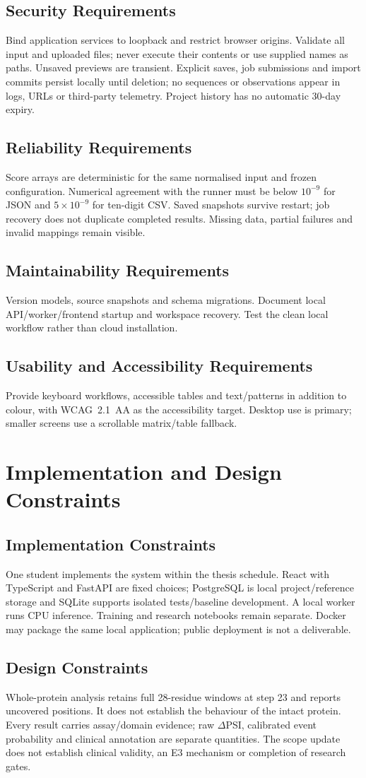 \subsection{Security Requirements}
Bind application services to loopback and restrict browser origins. Validate all input and uploaded files;
never execute their contents or use supplied names as paths. Unsaved previews are transient. Explicit
saves, job submissions and import commits persist locally until deletion; no sequences or observations
appear in logs, URLs or third-party telemetry. Project history has no automatic 30-day expiry.
\subsection{Reliability Requirements}
Score arrays are deterministic for the same normalised input and frozen configuration. Numerical
agreement with the runner must be below $10^{-9}$ for JSON and $5\times10^{-9}$ for ten-digit CSV.
Saved snapshots survive restart; job recovery does not duplicate completed results. Missing data,
partial failures and invalid mappings remain visible.
\subsection{Maintainability Requirements}
Version models, source snapshots and schema migrations. Document local API/worker/frontend startup and
workspace recovery. Test the clean local workflow rather than cloud installation.
\subsection{Usability and Accessibility Requirements}
Provide keyboard workflows, accessible tables and text/patterns in addition to colour, with WCAG~2.1~AA
as the accessibility target. Desktop use is primary; smaller screens use a scrollable matrix/table fallback.

\section{Implementation and Design Constraints}
\subsection{Implementation Constraints}
One student implements the system within the thesis schedule. React with TypeScript and FastAPI are
fixed choices; PostgreSQL is local project/reference storage and SQLite supports isolated tests/baseline
development. A local worker runs CPU inference. Training and research notebooks remain separate.
Docker may package the same local application; public deployment is not a deliverable.
\subsection{Design Constraints}
Whole-protein analysis retains full 28-residue windows at step 23 and reports uncovered positions.
It does not establish the behaviour of the intact protein. Every result carries assay/domain evidence;
raw $\Delta$PSI, calibrated event probability and clinical annotation are separate quantities. The scope
update does not establish clinical validity, an E3 mechanism or completion of research gates.
